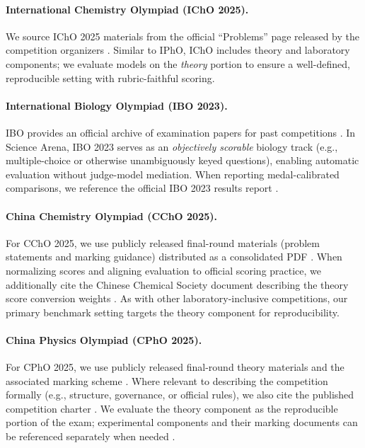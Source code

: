 \documentclass[11pt]{article}
\begin{document}
\paragraph{International Chemistry Olympiad (IChO 2025).}
We source IChO 2025 materials from the official ``Problems'' page released by the competition organizers \citep{icho2025_problems_page}. Similar to IPhO, IChO includes theory and laboratory components; we evaluate models on the \emph{theory} portion to ensure a well-defined, reproducible setting with rubric-faithful scoring.

\paragraph{International Biology Olympiad (IBO 2023).}
IBO provides an official archive of examination papers for past competitions \citep{ibo_papers_archive}. In Science Arena, IBO 2023 serves as an \emph{objectively scorable} biology track (e.g., multiple-choice or otherwise unambiguously keyed questions), enabling automatic evaluation without judge-model mediation. When reporting medal-calibrated comparisons, we reference the official IBO 2023 results report \citep{ibo2023_final_results}.

\paragraph{China Chemistry Olympiad (CChO 2025).}
For CChO 2025, we use publicly released final-round materials (problem statements and marking guidance) distributed as a consolidated PDF \citep{ccho2025_final_theory_paper_public_pdf}. When normalizing scores and aligning evaluation to official scoring practice, we additionally cite the Chinese Chemical Society document describing the theory score conversion weights \citep{ccho2025_theory_weighting_chemsoc}. As with other laboratory-inclusive competitions, our primary benchmark setting targets the theory component for reproducibility.

\paragraph{China Physics Olympiad (CPhO 2025).}
For CPhO 2025, we use publicly released final-round theory materials and the associated marking scheme \citep{cpho2025_final_theory_paper_public_pdf,cpho2025_final_theory_solution_marking_public_pdf}. Where relevant to describing the competition formally (e.g., structure, governance, or official rules), we also cite the published competition charter \citep{cpho_charter_2025_revision}. We evaluate the theory component as the reproducible portion of the exam; experimental components and their marking documents can be referenced separately when needed \citep{cpho2025_final_practical_paper_public_pdf,cpho2025_final_practical_answer_key_public_pdf}.
\end{document}
